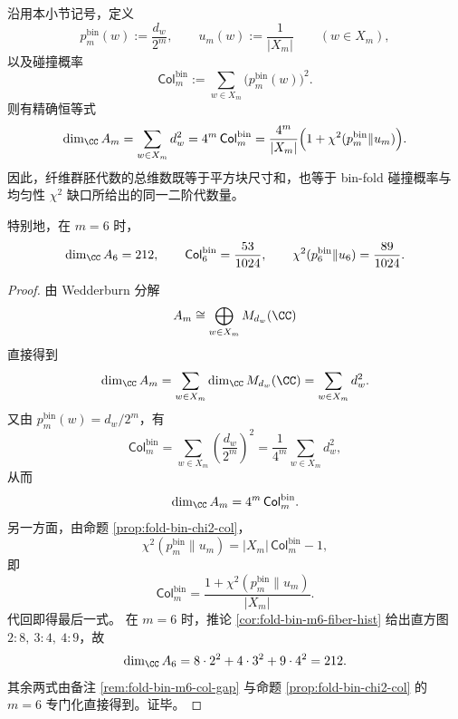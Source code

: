 \begin{theorem}\label{thm:conclusion-foldbin-groupoid-dimension-collision-chi2}
沿用本小节记号，定义
\[
p_m^{\mathrm{bin}}(w):=\frac{d_w}{2^m},
\qquad
u_m(w):=\frac{1}{|X_m|}
\qquad (w\in X_m),
\]
以及碰撞概率
\[
\mathsf{Col}^{\mathrm{bin}}_m:=\sum_{w\in X_m}\bigl(p_m^{\mathrm{bin}}(w)\bigr)^2.
\]
则有精确恒等式
\[
\dim_{\CC}A_m
=
\sum_{w\in X_m} d_w^2
=
4^m\,\mathsf{Col}^{\mathrm{bin}}_m
=
\frac{4^m}{|X_m|}\Bigl(1+\chi^2(p_m^{\mathrm{bin}}\|u_m)\Bigr).
\]
因此，纤维群胚代数的总维数既等于平方块尺寸和，也等于 bin-fold 碰撞概率与均匀性 \(\chi^2\) 缺口所给出的同一二阶代数量。

特别地，在 \(m=6\) 时，
\[
\dim_{\CC}A_6=212,
\qquad
\mathsf{Col}^{\mathrm{bin}}_6=\frac{53}{1024},
\qquad
\chi^2(p_6^{\mathrm{bin}}\|u_6)=\frac{89}{1024}.
\]
\end{theorem}
\begin{proof}
由 Wedderburn 分解
\[
A_m\cong \bigoplus_{w\in X_m}M_{d_w}(\CC)
\]
直接得到
\[
\dim_{\CC}A_m=\sum_{w\in X_m}\dim_{\CC}M_{d_w}(\CC)=\sum_{w\in X_m}d_w^2.
\]
又由 \(p_m^{\mathrm{bin}}(w)=d_w/2^m\)，有
\[
\mathsf{Col}^{\mathrm{bin}}_m
=
\sum_{w\in X_m}\left(\frac{d_w}{2^m}\right)^2
=
\frac{1}{4^m}\sum_{w\in X_m}d_w^2,
\]
从而
\[
\dim_{\CC}A_m=4^m\,\mathsf{Col}^{\mathrm{bin}}_m.
\]
另一方面，由命题 \ref{prop:fold-bin-chi2-col}，
\[
\chi^2(p_m^{\mathrm{bin}}\|u_m)=|X_m|\,\mathsf{Col}^{\mathrm{bin}}_m-1,
\]
即
\[
\mathsf{Col}^{\mathrm{bin}}_m=\frac{1+\chi^2(p_m^{\mathrm{bin}}\|u_m)}{|X_m|}.
\]
代回即得最后一式。
在 \(m=6\) 时，推论 \ref{cor:fold-bin-m6-fiber-hist} 给出直方图 \(2:8,\ 3:4,\ 4:9\)，故
\[
\dim_{\CC}A_6=8\cdot 2^2+4\cdot 3^2+9\cdot 4^2=212.
\]
其余两式由备注 \ref{rem:fold-bin-m6-col-gap} 与命题 \ref{prop:fold-bin-chi2-col} 的 \(m=6\) 专门化直接得到。证毕。
\end{proof}

